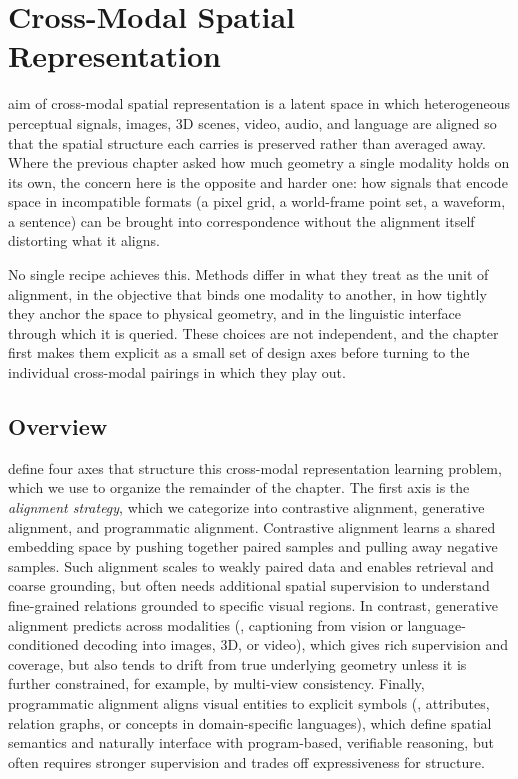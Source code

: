 \chapter{Cross-Modal Spatial Representation}
\label{chapter:cross_modality}


aim of cross-modal spatial representation is a latent space in which heterogeneous perceptual signals, images, 3D scenes, video, audio, and language are aligned so that the spatial structure each carries is preserved rather than averaged away.
Where the previous chapter asked how much geometry a single modality holds on its own, the concern here is the opposite and harder one: how signals that encode space in incompatible formats (a pixel grid, a world-frame point set, a waveform, a sentence) can be brought into correspondence without the alignment itself distorting what it aligns.

No single recipe achieves this.
Methods differ in what they treat as the unit of alignment, in the objective that binds one modality to another, in how tightly they anchor the space to physical geometry, and in the linguistic interface through which it is queried.
These choices are not independent, and the chapter first makes them explicit as a small set of design axes before turning to the individual cross-modal pairings in which they play out.

\section{Overview}
\label{sec:cross_modal_overview}

 define four axes that structure this cross-modal representation learning problem, which we use to organize the remainder of the chapter. 
The first axis is the \textit{alignment strategy}, which we categorize into contrastive alignment, generative alignment, and programmatic alignment. 
Contrastive alignment learns a shared embedding space by pushing together paired samples and pulling away negative samples. 
Such alignment scales to weakly paired data and enables retrieval and coarse grounding, but often needs additional spatial supervision to understand fine-grained relations grounded to specific visual regions. 
In contrast, generative alignment predicts across modalities (\eg, captioning from vision or language-conditioned decoding into images, 3D, or video), which gives rich supervision and coverage, but also tends to drift from true underlying geometry unless it is further constrained, for example, by multi-view consistency. 
Finally, programmatic alignment aligns visual entities to explicit symbols (\eg, attributes, relation graphs, or concepts in domain-specific languages), which define spatial semantics and naturally interface with program-based, verifiable reasoning, but often requires stronger supervision and trades off expressiveness for structure.

